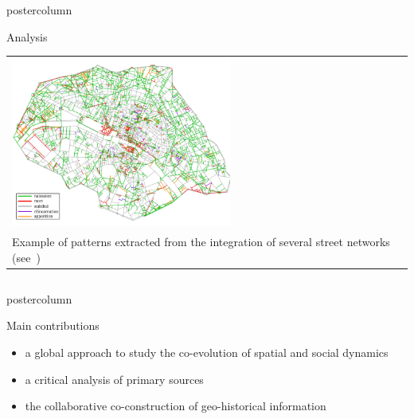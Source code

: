 \documentclass[final,hyperref={pdfpagelabels=false}]{beamer}
\let\oldcite=\cite
\renewcommand{\cite}[1]{\textcolor{ta3chameleon}{\oldcite{#1}}}
\begin{document}
\begin{frame}
\begin{columns}
\begin{column}{0.5\textwidth}
\begin{beamercolorbox}[center,wd=\textwidth]{postercolumn}
\begin{minipage}[t]{.98\textwidth}
\begin{block}{Analysis}
      
	\begin{tabular}{>{\centering}m{}}
	  \includegraphics[width=0.56\textwidth]{figures/patterns}\\
	  \scriptsize Example of patterns extracted from the integration of several street networks (see~\cite{Costes2015_,Costes2016PhD})\\
        \end{tabular}
      \end{block}
    \end{minipage}
    \end{beamercolorbox}
    \end{column}
  \end{columns}
  \begin{columns}
    \begin{column}{0.6\textwidth}
    \begin{beamercolorbox}[center,wd=\textwidth]{postercolumn}
    \begin{minipage}[t]{.98\textwidth}
      \begin{block}{Main contributions}%
        \tiny
        \begin{itemize}
        \item a \textcolor{ta3orange}{global approach} to study the co-evolution of spatial and social dynamics~\cite{Dumenieu2013a, Dumenieu2015PhD}
        \item a \textcolor{ta3orange}{critical analysis} of \textcolor{ta3orange}{primary sources}~\cite{Costes2015_, Dumenieu2015PhD, Costes2016PhD, Dumenieu2018}
        \item the \textcolor{ta3orange}{collaborative co-construction} of geo-historical information~\cite{Perret2015_, Perret2015Data_, Cura2018}

\end{itemize}
\end{block}
\end{minipage}
\end{beamercolorbox}
\end{column}
\end{columns}
\end{frame}
\end{document}
